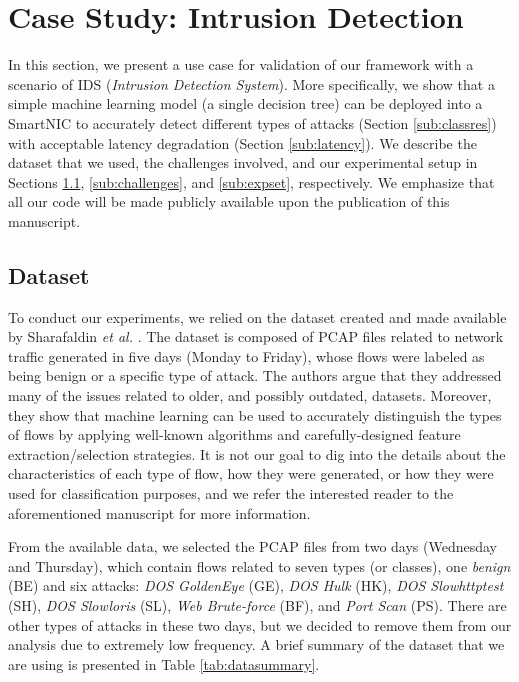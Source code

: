 \section{Case Study: Intrusion Detection} \label{sec:case}

In this section, we present a use case for validation of our framework with a scenario of IDS (\emph{Intrusion Detection System}). More specifically, we show that a simple machine learning model (a single decision tree) can be deployed into a SmartNIC to accurately detect different types of attacks (Section \ref{sub:classres}) with acceptable latency degradation (Section \ref{sub:latency}). We describe the dataset that we used, the challenges involved, and our experimental setup in Sections \ref{sub:dataset}, \ref{sub:challenges}, and \ref{sub:expset}, respectively. We emphasize that all our code will be made publicly available upon the publication of this manuscript.

\subsection{Dataset}\label{sub:dataset}

To conduct our experiments, we relied on the dataset created and made available by Sharafaldin \emph{et al.} \cite{sharafaldin2018toward}. 
The dataset is composed of PCAP files related to network traffic generated in five days (Monday to Friday), whose flows were labeled as being benign or a specific type of attack. The authors argue that they addressed many of the issues related to older, and possibly outdated, datasets.
Moreover, they show that machine learning can be used to accurately distinguish the types of flows by applying well-known algorithms and carefully-designed feature extraction/selection strategies.
It is not our goal to dig into the details about the characteristics of each type of flow, how they were generated, or how they were used for classification purposes, and we refer the interested reader to the aforementioned manuscript for more information.

From the available data, we selected the PCAP files from two days (Wednesday and Thursday), which contain flows related to seven types (or classes), one \emph{benign} (BE) and six attacks: \emph{DOS GoldenEye} (GE), \emph{DOS Hulk} (HK), \emph{DOS Slowhttptest} (SH), \emph{DOS Slowloris} (SL), \emph{Web Brute-force} (BF), and \emph{Port Scan} (PS). 
There are other types of attacks in these two days, but we decided to remove them from our analysis due to extremely low frequency.
A brief summary of the dataset that we are using is presented in Table \ref{tab:datasummary}.

